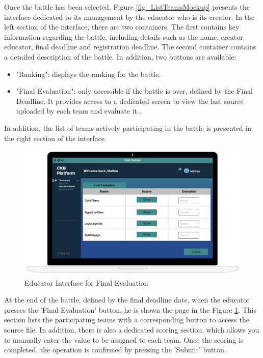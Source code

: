 Once the battle has been selected, Figure \ref{fig_ListTeamsMockup} presents the interface dedicated to its management by the educator who is its creator.
\newline
In the left section of the interface, there are two containers. The first contains key information regarding the battle, including details such as the name, creator educator, final deadline and registration deadline. The second container contains a detailed description of the battle.
\newline
In addition, two buttons are available:
\begin{itemize}
    \setlength{\itemsep}{0pt}
    \setlength{\parskip}{0pt}
    \setlength{\parsep}{0pt}
    \setlength{\partopsep}{0pt}
    \setlength{\topsep}{0pt}
    \item "Ranking": displays the ranking for the battle.
    \item "Final Evaluation": only accessible if the battle is over, defined by the Final Deadline. It provides access to a dedicated screen to view the last source uploaded by each team and evaluate it..
\end{itemize}


In addition, the list of teams actively participating in the battle is presented in the right section of the interface.

\clearpage
\begin{figure}[h]
    \centering
    \includegraphics[scale=0.35]{images/Mockup/FinalEvaluationMockup.png} 
    \caption{Educator Interface for Final Evaluation}
    \label{fig_FinalEvaluationMockup}
\end{figure}
At the end of the battle, defined by the final deadline date, when the educator presses the 'Final Evaluation' button, he is shown the page in the Figure \ref{fig_FinalEvaluationMockup}. 
\newline
This section lists the participating teams with a corresponding button to access the source file. In addition, there is also a dedicated scoring section, which allows you to manually enter the value to be assigned to each team.
\newline
Once the scoring is completed, the operation is confirmed by pressing the 'Submit' button.


